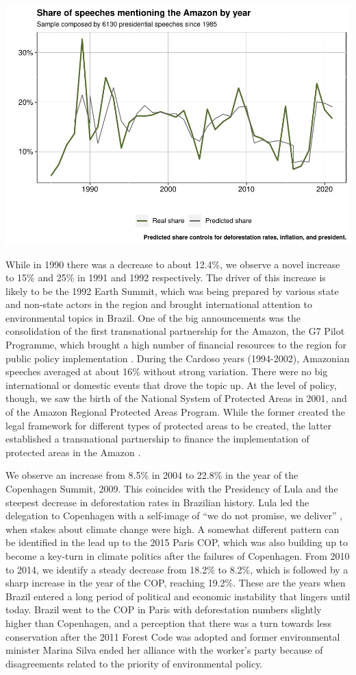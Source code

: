 \documentclass[]{interact}
\theoremstyle{plain}%
\theoremstyle{definition}
\theoremstyle{remark}
\begin{document}
\includegraphics[width=0.9\linewidth]{rticle_files/figure-latex/Figure 1: Amazonian speeches by year-1}

While in 1990 there was a decrease to about 12.4\%, we observe a novel
increase to 15\% and 25\% in 1991 and 1992 respectively. The driver of
this increase is likely to be the 1992 Earth Summit, which was being
prepared by various state and non-state actors in the region and brought
international attention to environmental topics in Brazil. One of the
big announcements was the consolidation of the first transnational
partnership for the Amazon, the G7 Pilot Programme, which brought a high
number of financial resources to the region for public policy
implementation \citep{capobianco2021}. During the Cardoso years
(1994-2002), Amazonian speeches averaged at about 16\% without strong
variation. There were no big international or domestic events that drove
the topic up. At the level of policy, though, we saw the birth of the
National System of Protected Areas in 2001, and of the Amazon Regional
Protected Areas Program. While the former created the legal framework
for different types of protected areas to be created, the latter
established a transnational partnership to finance the implementation of
protected areas in the Amazon \citep{andonova2014}.

We observe an increase from 8.5\% in 2004 to 22.8\% in the year of the
Copenhagen Summit, 2009. This coincides with the Presidency of Lula and
the steepest decrease in deforestation rates in Brazilian history. Lula
led the delegation to Copenhagen with a self-image of ``we do not
promise, we deliver'' \citep{franchini2019}, when stakes about climate
change were high. A somewhat different pattern can be identified in the
lead up to the 2015 Paris COP, which was also building up to become a
key-turn in climate politics after the failures of Copenhagen. From 2010
to 2014, we identify a steady decrease from 18.2\% to 8.2\%, which is
followed by a sharp increase in the year of the COP, reaching 19.2\%.
These are the years when Brazil entered a long period of political and
economic instability that lingers until today. Brazil went to the COP in
Paris with deforestation numbers slightly higher than Copenhagen, and a
perception that there was a turn towards less conservation after the
2011 Forest Code was adopted and former environmental minister Marina
Silva ended her alliance with the worker's party because of
disagreements related to the priority of environmental policy.
\end{document}
